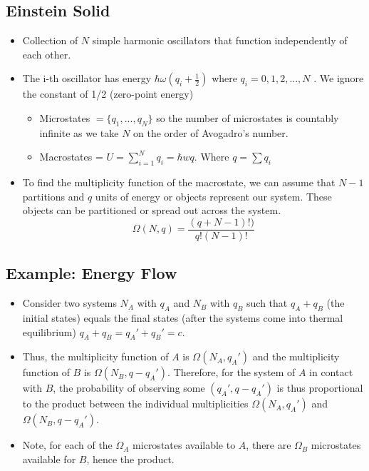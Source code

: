 \documentclass[8pt]{article}
\begin{document}
 \subsection{Einstein Solid}
 \begin{itemize}
     \item Collection of $N$ simple harmonic oscillators that function independently of each other. 
     \item The i-th oscillator has energy $\hbar \omega (q_i+ \frac{1}{2})$ where $q_i = 0,1,2, ..., N $ . We ignore the constant of 1/2 (zero-point energy)
     \begin{itemize}
         \item Microstates $= \{q_1 , ... , q_N \}$ so the number of microstates is countably infinite as we take $N$ on the order of Avogadro's number. 
         \item Macrostates = $ U = \sum_{i=1}^{N}q_i = \hbar w q$. Where $q = \sum q_i$  
     \end{itemize}
     \item To find the multiplicity function of the macrostate, we can assume that $N−1$ partitions and $q$ units of energy or objects represent our system. These objects can be partitioned or spread out across the system. \[\Omega(N, q) = \frac{(q+N-1)!)}{q! (N-1)!}\]
 \end{itemize}
\subsection{Example: Energy Flow}
    \begin{itemize}
        \item Consider two systems $N_A$ with $q_A$ and $N_B$ with $q_B$ such that $q_A + q_B$ (the initial states) equals the final states (after the systems come into thermal equilibrium) $q_A + q_B = q_A' + q_B' = c$.
        \item Thus, the multiplicity function of $A$ is $\Omega(N_A, q_A')$ and the multiplicity function of $B$ is $\Omega (N_B, q-q_A')$. Therefore, for the system of $A$ in contact with $B$, the probability of observing some $(q_A', q-q_A')$ is thus proportional to the product between the individual multiplicities $\Omega(N_A,q_A')$ and $\Omega(N_B, q-q_A')$.
        \item Note, for each of the $\Omega_A$ microstates available to $A$, there are $\Omega_B$ microstates available for $B$, hence the product.
    \end{itemize}
\end{document}
